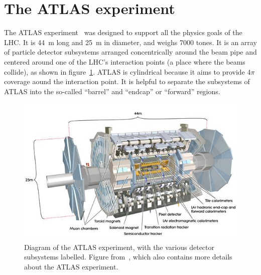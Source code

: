 

\section{The ATLAS experiment}
\label{sec:atlas}

The ATLAS experiment~\cite{collaboration_atlas_2008} was designed to support all the physics goals of the LHC. It is \SI{44}{\meter} long and \SI{25}{\meter} in diameter, and weighs 7000 tones. It is an array of particle detector subsystems arranged concentrically around the beam pipe and centered around one of the LHC's interaction points (a place where the beams collide), as shown in figure~\ref{fig:atlas}. ATLAS is cylindrical because it aims to provide 4$\pi$ coverage aound the interaction point. It is helpful to separate the subsystems of ATLAS into the so-called ``barrel'' and ``endcap'' or ``forward'' regions.  %

\begin{figure}
    \centering
    \includegraphics[width = \textwidth]{figures/atlas_diagram.png}
    \caption{Diagram of the ATLAS experiment, with the various detector subsystems labelled. Figure from~\cite{collaboration_atlas_2008}, which also contains more details about the ATLAS experiment.}
    \label{fig:atlas}
\end{figure}

